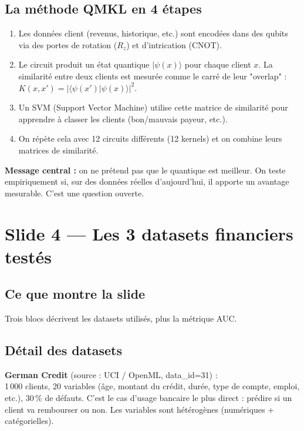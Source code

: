 \documentclass[12pt, a4paper]{article}
\begin{document}
\subsection*{La méthode QMKL en 4 étapes}

\begin{enumerate}
  \item Les données client (revenus, historique, etc.) sont encodées dans des qubits
        via des portes de rotation ($R_z$) et d'intrication (CNOT).
  \item Le circuit produit un état quantique $|\psi(x)\rangle$ pour chaque client $x$.
        La similarité entre deux clients est mesurée comme le carré
        de leur "overlap" : $K(x,x') = |\langle\psi(x')|\psi(x)\rangle|^2$.
  \item Un SVM (Support Vector Machine) utilise cette matrice de similarité
        pour apprendre à classer les clients (bon/mauvais payeur, etc.).
  \item On répète cela avec 12 circuits différents (12 kernels)
        et on combine leurs matrices de similarité.
\end{enumerate}

\begin{retenir}
\textbf{Message central :} on ne prétend pas que le quantique est meilleur.
On teste empiriquement si, sur des données réelles d'aujourd'hui,
il apporte un avantage mesurable. C'est une question ouverte.
\end{retenir}

\section{Slide 4 — Les 3 datasets financiers testés}

\subsection*{Ce que montre la slide}

Trois blocs décrivent les datasets utilisés, plus la métrique AUC.

\subsection*{Détail des datasets}

\textbf{German Credit} (source : UCI / OpenML, data\_id=31) :\\
1\,000 clients, 20 variables (âge, montant du crédit, durée, type de compte, emploi, etc.),
30\,\% de défauts. C'est le cas d'usage bancaire le plus direct : prédire si un client
va rembourser ou non. Les variables sont hétérogènes (numériques + catégorielles).
\end{document}
